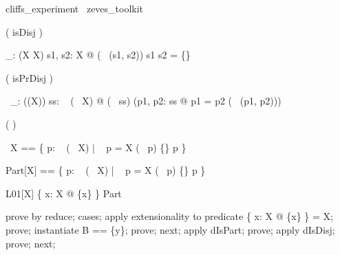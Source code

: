 
\begin{zsection}
   \SECTION cliffs\_experiment \parents~zeves\_toolkit
\end{zsection}

\begin{zed}
  \relation ( isDisj \varg )
\end{zed}

\begin{gendef}[X]
  \isDisj\_: \power  (\power  X \cross  \power  X)
\where
    \forall  s1, s2: \power  X @ (\isDisj~ (s1, s2)) \iff  s1 \cap  s2 = \{\}
\end{gendef}

\begin{zed}
  \relation ( isPrDisj \varg )
\end{zed}

\begin{gendef}[X]
  \isPrDisj~\_: \power  (\power  (\power  X))
\where
    \forall  ss: \power~  (\power~  X) @ (\isPrDisj~ ss) \iff  (\forall  p1, p2: ss @ p1 = p2 \lor  (\isDisj~ (p1, p2)))
\end{gendef}

\begin{zed}
  \generic ( \PartNo \varg )
\end{zed}

\begin{zed}
 \PartNo~X == \{  p: \power~  (\power~  X) | \bigcup~ p = X \land  (\isPrDisj~ p) \land  \{\} \notin  p \}
\end{zed}

\begin{zed}
Part[X] == \{  p: \power~  (\power~  X) | \bigcup~ p = X \land  (\isPrDisj~ p) \land  \{\} \notin  p \}
\end{zed}

\begin{theorem}{L01}[X]
\{  x: X @ \{x\} \} \in  Part
\end{theorem}

\begin{zproof}[L01]
prove by reduce;
cases;
apply extensionality to predicate \bigcup [X] \{  x: X @ \{x\} \} = X;
prove;
instantiate B == \{y\};
prove;
next;
apply dIsPart;
prove;
apply dIsDisj;
prove;
next;
\end{zproof}

